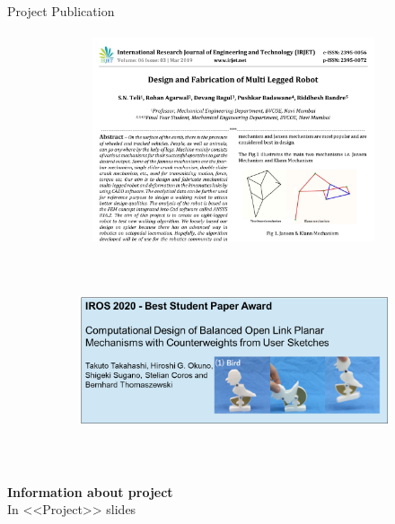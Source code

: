 \documentclass[aspectratio=169]{beamer}
\begin{document}
\begin{frame}[t]{Project Publication}
    \framesubtitle{}
    \vspace{-0.6cm}
    \begin{figure}[H]
        \begin{subfigure}{0.49\textwidth}
            \centering\includegraphics[height=6cm,width=1\textwidth,keepaspectratio]{resources/indian.png}
            \label{fig:resources/indian.png}
        \end{subfigure}
        \begin{subfigure}{0.49\textwidth}
            \centering\includegraphics[height=6cm,width=1\textwidth,keepaspectratio]{resources/iros.png}
            \label{fig:resources/iros.png}
        \end{subfigure}
    \end{figure}
\end{frame}

\begin{frame}[c]{}
    \framesubtitle{}
    \LARGE \centering
    \textbf{Information about project} \\ In <<Project>> slides
\end{frame}
\end{document}
